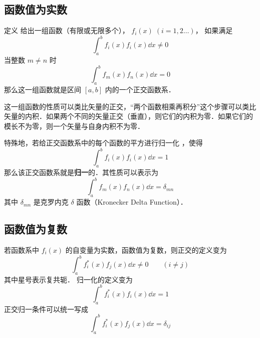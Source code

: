 
\subsection{函数值为实数}

定义
给出一组函数（有限或无限多个）， $f_i(x)\; (i = 1,2\dots)$， 如果满足
\begin{equation}
\int_a^b f_i(x) f_i(x) \dd{x} \ne 0
\end{equation} 
当整数 $m \ne n$ 时
\begin{equation}
\int_a^b f_m(x) f_n(x) \dd{x} = 0
\end{equation} 
那么这一组函数就是区间 $[a,b]$ 内的一个正交函数系．

这一组函数的性质可以类比矢量的正交，“两个函数相乘再积分”这个步骤可以类比矢量的内积．如果两个不同的矢量正交（垂直），则它们的内积为零．如果它们的模长不为零，则一个矢量与自身内积不为零．

特殊地，若给正交函数系中的每个函数的平方进行归一化%
，使得
\begin{equation}
\int_a^b f_i(x) f_i(x) \dd{x} = 1
\end{equation} 
那么该正交函数系就是\textbf{归一}的．其性质可以表示为
 \begin{equation}
\int_a^b f_m(x) f_n(x) \dd{x} = \delta_{mn}
\end{equation} 
其中 $\delta_{mn}$ 是克罗内克 $\delta$ 函数（Kronecker Delta Function）．


\subsection{函数值为复数}

若函数系中 $f_i(x)$ 的自变量为实数，函数值为复数，则正交的定义变为
 \begin{equation}
\int_a^b f_i^*(x) f_j(x) \dd{x} \ne 0 \qquad ( i \ne j )
\end{equation}    
其中星号表示复共轭． 归一化的定义变为
 \begin{equation}
\int_a^b f_i^*(x) f_i(x) \dd{x} = 1
\end{equation} 
正交归一条件可以统一写成
 \begin{equation}
\int_a^b f_i^*(x) f_j(x) \dd{x} = \delta_{ij}
\end{equation}